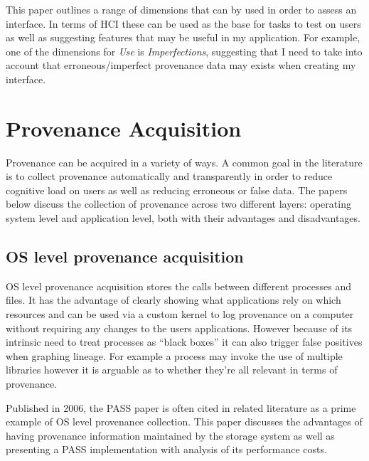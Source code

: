 This paper outlines a range of dimensions that can by used in order to assess an interface. In terms of HCI these can be used as the base for tasks to test on users as well as suggesting features that may be useful in my application. For example, one of the dimensions for \textit{Use} is \textit{Imperfections}, suggesting that I need to take into account that erroneous/imperfect provenance data may exists when creating my interface.

\section{Provenance Acquisition}
\label{sec:provenance_acquisition}

Provenance can be acquired in a variety of ways. A common goal in the literature is to collect provenance automatically and transparently in order to reduce cognitive load on users as well as reducing erroneous or false data. The papers below discuss the collection of provenance across two different layers: operating system level and application level, both with their advantages and disadvantages.

\subsection{OS level provenance acquisition}
\label{sub:os_level_provenance_acquisition}

OS level provenance acquisition stores the calls between different processes and files. It has the advantage of clearly showing what applications rely on which resources and can be used via a custom kernel to log provenance on a computer without requiring any changes to the users applications.
However because of its intrinsic need to treat processes as ``black boxes'' it can also trigger false positives when graphing lineage. For example a process may invoke the use of multiple libraries however it is arguable as to whether they're all relevant in terms of provenance.


Published in 2006, the PASS paper is often cited in related literature as a prime example of OS level provenance collection. This paper discusses the advantages of having provenance information maintained by the storage system as well as presenting a PASS implementation with analysis of its performance costs.

